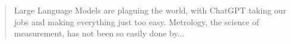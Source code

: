 \documentclass[
11pt, %
oneside, %
english, %
singlespacing, %
headsepline, %
]{structure} %
\begin{document}


\begin{abstract}
\addchaptertocentry{\abstractname} %
Large Language Models are plaguing the world, with ChatGPT taking our jobs and making everything just too easy. Metrology, the science of measurement, has not been so easily done by...
\end{abstract}




\tableofcontents %






\end{document}
